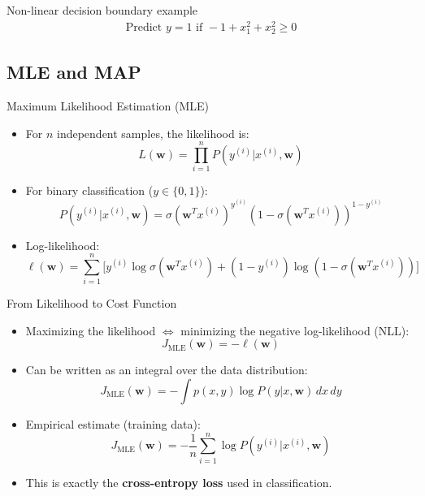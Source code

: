 \documentclass[serif, aspectratio=169]{beamer}
\begin{document}
\begin{frame}{Non-linear decision boundary example}
        \begin{align*}
            \text{Predict } y=1 \text{ if } -1 + x_1^2 + x_2^2 \geq 0
        \end{align*}

    \end{frame}
    \subsection{MLE and MAP}

    \begin{frame}{Maximum Likelihood Estimation (MLE)}
        \begin{itemize}
            \item For $n$ independent samples, the likelihood is:
            \[
                L(\mathbf{w}) = \prod_{i=1}^{n} P(y^{(i)}|x^{(i)}, \mathbf{w})
            \]
            \item For binary classification ($y \in \{0,1\}$):
            \[
                P(y^{(i)}|x^{(i)},\mathbf{w}) = \sigma (\mathbf{w}^Tx^{(i)})^{y^{(i)}} (1 - \sigma (\mathbf{w}^Tx^{(i)}))^{1 - y^{(i)}}
            \]
            \item Log-likelihood:
            \[
                \ell(\mathbf{w}) = \sum_{i=1}^n \big[ y^{(i)} \log \sigma(\mathbf{w}^Tx^{(i)}) + (1-y^{(i)})\log (1-\sigma(\mathbf{w}^Tx^{(i)})) \big]
            \]
        \end{itemize}
    \end{frame}

    \begin{frame}{From Likelihood to Cost Function}
        \begin{itemize}
            \item Maximizing the likelihood $\Leftrightarrow$ minimizing the negative log-likelihood (NLL):
            \[
                J_{\text{MLE}}(\mathbf{w}) = -\ell(\mathbf{w})
            \]
            \item Can be written as an integral over the data distribution:
            \[
                J_{\text{MLE}}(\mathbf{w}) = - \int p(x,y) \log P(y|x, \mathbf{w}) \, dx\,dy
            \]
            \item Empirical estimate (training data):
            \[
                J_{\text{MLE}}(\mathbf{w}) = -\frac{1}{n}\sum_{i=1}^{n} \log P(y^{(i)}|x^{(i)}, \mathbf{w})
            \]
            \item This is exactly the \textbf{cross-entropy loss} used in classification.
        \end{itemize}
    \end{frame}
\end{document}
